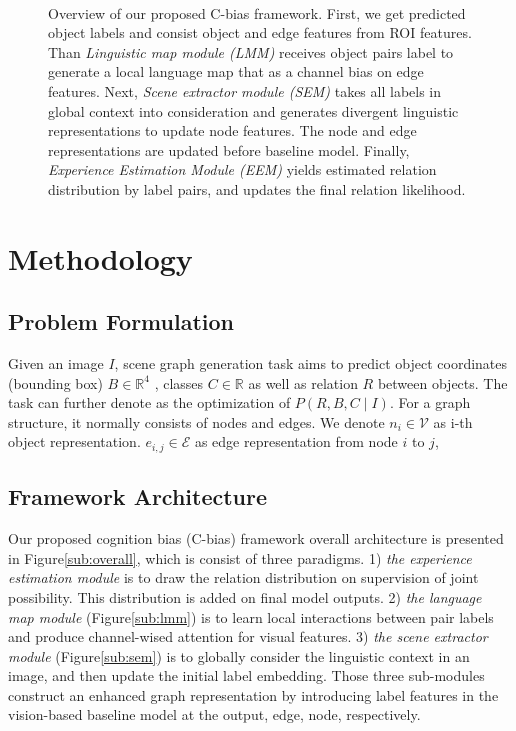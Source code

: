 \documentclass[runningheads]{llncs}
\begin{document}
\begin{figure}[t!]
  \\
  \quad
  \caption{Overview of our proposed C-bias framework. First, we get
    predicted object labels and consist object and edge features from ROI features.
    Than \textit{Linguistic map module (LMM)} receives object pairs label to
    generate a local language map that as a channel bias on edge features. Next,
    \textit{Scene extractor module (SEM)} takes all labels in global context into
    consideration and generates divergent linguistic representations to update node
    features. The node and edge representations are updated before baseline model.
    Finally, \textit{Experience Estimation Module (EEM)} yields estimated relation
    distribution by label pairs, and updates the final relation likelihood.}
  \label{net}
\end{figure}

\section{Methodology}
\subsection{Problem Formulation}
Given an image $I$, scene graph generation task aims to predict object
coordinates (bounding box) $B \in \mathbb{R}^{4}$ , classes $C \in \mathbb{R}$
as well as relation $R$ between objects. The task can further denote as the
optimization of $P\left(R,B,C\mid I\right)$. For a graph structure, it
normally consists of nodes and edges. We denote $n_{i} \in {\mathcal{V}}$ as
i-th object representation. $e_{i, j} \in {\mathcal{E}}$ as edge representation
from node $i$ to $j$,

\subsection{Framework Architecture}
Our proposed cognition bias (C-bias) framework overall architecture is
presented in Figure\ref{sub:overall}, which is consist of three paradigms. 1)
\textit{the experience estimation module} is to draw the relation distribution
on supervision of joint possibility. This distribution is added on final model
outputs. 2) \textit{the language map module} (Figure\ref{sub:lmm}) is to learn
local interactions between pair labels and produce channel-wised attention for
visual features. 3) \textit{the scene extractor module} (Figure\ref{sub:sem})
is to globally consider the linguistic context in an image, and then update the
initial label embedding. Those three sub-modules construct an enhanced graph
representation by introducing label features in the vision-based baseline model
at the output, edge, node, respectively.
\setcounter{secnumdepth}{3}
\end{document}
